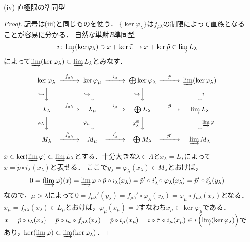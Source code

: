 \begin{screen}
  (iv) 直極限の準同型
\end{screen}
\begin{proof}
  記号は(iii)と同じものを使う．
  $\{\ker \varphi_\lambda\}$は$f_{\mu \lambda}$の制限によって直族となることが容易に分かる．
  自然な単射$R$準同型
  \[\imath\colon \varinjlim (\ker \varphi_\lambda) \ni x + \ker \tilde{\pi} \mapsto x + \ker \tilde{p} \in \varinjlim L_\lambda\]
  によって$\varinjlim (\ker \varphi_\lambda) \subset \varinjlim L_\lambda$とみなす．

  \[
  \begin{CD}
    \ker \varphi_\lambda @>{f_{\mu \lambda}}>> \ker \varphi_\mu @>{i_\mu}>> \bigoplus \ker \varphi_\lambda @>{\tilde{\pi}}>> \varinjlim (\ker \varphi_\lambda) \\
    @V{\hookrightarrow}VV @V{\hookrightarrow}VV @V{\hookrightarrow}VV @VV{\imath}V \\
    L_\lambda @>{f_{\mu \lambda}}>> L_\mu @>{i_\mu}>> \bigoplus L_\lambda @>{\tilde{p}}>> \varinjlim L_\lambda \\
    @V{\varphi_\lambda}VV @V{\varphi_\mu}VV @V{\varphi_\lambda^\oplus}VV @VV{\varinjlim \varphi}V \\
    M_\lambda @>{f_{\mu \lambda}'}>> M_\mu @>{i_\mu'}>> \bigoplus M_\lambda @>{\tilde{p}'}>> \varinjlim M_\lambda
  \end{CD}
  \]

  $x \in \ker(\varinjlim \varphi) \subset \varinjlim L_\lambda$とする．十分大きな$\lambda \in \Lambda$と$x_\lambda = L_\lambda$によって$x = \tilde{p} \circ i_\lambda (x_\lambda)$と表せる．
  ここで$y_\lambda = \varphi_\lambda (x_\lambda) \in M_\lambda$とおけば，
  \[0 = (\varinjlim \varphi) (x) =  \varinjlim \varphi \circ \tilde{p} \circ i_\lambda (x_\lambda) = \tilde{p}' \circ i_\lambda' \circ \varphi_\lambda (x_\lambda) = \tilde{p}' \circ i_\lambda' (y_\lambda) \]
  なので，$\mu > \lambda$によって$0 = f_{\mu \lambda}' (y_\lambda) = f_{\mu \lambda}' \circ \varphi_\lambda (x_\lambda) = \varphi_\mu \circ f_{\mu \lambda} (x_\lambda)$となる．
  $x_\mu = f_{\mu \lambda} (x_\lambda) \in L_\mu$とおけば，$\varphi_\mu (x_\mu) = 0$すなわち$x_\mu \in \ker \varphi_\mu$である．
  $x = \tilde{p} \circ i_\lambda (x_\lambda) = \tilde{p} \circ i_\mu \circ f_{\mu \lambda} (x_\lambda) = \tilde{p} \circ i_\mu (x_\mu) = \imath \circ \tilde{\pi} \circ i_\mu (x_\mu) \in \imath \left( \varinjlim (\ker \varphi_\lambda) \right)$であり，$\ker (\varinjlim \varphi) \subset \varinjlim (\ker \varphi_\lambda)$．


\end{proof}
